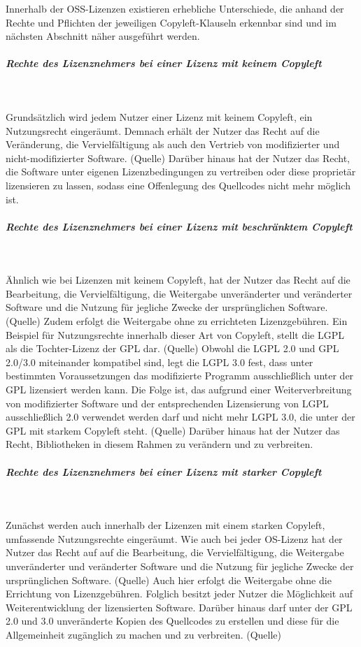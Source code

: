 Innerhalb der OSS-Lizenzen existieren erhebliche Unterschiede, die anhand der Rechte und Pflichten der jeweiligen Copyleft-Klauseln erkennbar sind und im nächsten Abschnitt näher ausgeführt werden. 

\subparagraph{Rechte des Lizenznehmers bei einer Lizenz mit keinem Copyleft}$~$

Grundsätzlich wird jedem Nutzer einer Lizenz mit keinem Copyleft, ein Nutzungsrecht eingeräumt. Demnach erhält der Nutzer das Recht auf die Veränderung, die Vervielfältigung als auch den Vertrieb von modifizierter und nicht-modifizierter Software. (Quelle) Darüber hinaus hat der Nutzer das Recht, die Software unter eigenen Lizenzbedingungen zu vertreiben oder diese proprietär lizensieren zu lassen, sodass eine Offenlegung des Quellcodes nicht mehr möglich ist.

\subparagraph{Rechte des Lizenznehmers bei einer Lizenz mit beschränktem Copyleft}$~$

Ähnlich wie bei Lizenzen mit keinem Copyleft, hat der Nutzer das Recht auf die Bearbeitung, die Vervielfältigung, die Weitergabe unveränderter und veränderter Software und die Nutzung für jegliche Zwecke der ursprünglichen Software. (Quelle) Zudem erfolgt die Weitergabe ohne zu errichteten Lizenzgebühren. Ein Beispiel für Nutzungsrechte innerhalb dieser Art von Copyleft, stellt die LGPL als die Tochter-Lizenz der GPL dar. (Quelle) Obwohl die LGPL 2.0 und GPL 2.0/3.0 miteinander kompatibel sind, legt die LGPL 3.0 fest, dass unter bestimmten Voraussetzungen das modifizierte Programm ausschließlich unter der GPL lizensiert werden kann. Die Folge ist, das aufgrund einer Weiterverbreitung von modifizierter Software und der entsprechenden Lizensierung von LGPL ausschließlich 2.0 verwendet werden darf und nicht mehr LGPL 3.0, die unter der GPL mit starkem Copyleft steht. (Quelle) Darüber hinaus hat der Nutzer das Recht, Bibliotheken in diesem Rahmen zu verändern und zu verbreiten. 

\subparagraph{Rechte des Lizenznehmers bei einer Lizenz mit starker Copyleft}$~$

Zunächst werden auch innerhalb der Lizenzen mit einem starken Copyleft, umfassende Nutzungsrechte eingeräumt. Wie auch bei jeder OS-Lizenz hat der Nutzer das Recht auf auf die Bearbeitung, die Vervielfältigung, die Weitergabe unveränderter und veränderter Software und die Nutzung für jegliche Zwecke der ursprünglichen Software. (Quelle) Auch hier erfolgt die Weitergabe ohne die Errichtung von Lizenzgebühren. Folglich besitzt jeder Nutzer die Möglichkeit auf Weiterentwicklung der lizensierten Software. Darüber hinaus darf unter der GPL 2.0 und 3.0 unveränderte Kopien des Quellcodes zu erstellen und diese für die Allgemeinheit zugänglich zu machen und zu verbreiten. (Quelle)

